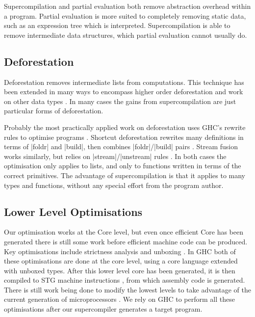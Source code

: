 \documentclass[draft]{sigplanconf}
\begin{document}
Supercompilation and partial evaluation both remove abstraction overhead within a program. Partial evaluation is more suited to completely removing static data, such as an expression tree which is interpreted. Supercompilation is able to remove intermediate data structures, which partial evaluation cannot usually do.

\subsection{Deforestation}

Deforestation \cite{wadler:deforestation} removes intermediate lists from computations. This technique has been extended in many ways to encompass higher order deforestation \cite{marlow:higher_order_deforestation} and work on other data types \cite{coutts:string_fusion}. In many cases the gains from supercompilation are just particular forms of deforestation.

Probably the most practically applied work on deforestation uses GHC's rewrite rules to optimise programs \cite{spj:rules}. Shortcut deforestation rewrites many definitions in terms of |foldr| and |build|, then combines |foldr|/|build| pairs \cite{gill:shortcut_deforestation}. Stream fusion works similarly, but relies on |stream|/|unstream| rules \cite{coutts:stream_fusion}. In both cases the optimisation only applies to lists, and only to functions written in terms of the correct primitives. The advantage of supercompilation is that it applies to many types and functions, without any special effort from the program author.

\subsection{Lower Level Optimisations}

Our optimisation works at the Core level, but even once efficient Core has been generated there is still some work before efficient machine code can be produced. Key optimisations include strictness analysis and unboxing \cite{spj:unboxing}. In GHC both of these optimisations are done at the core level, using a core language extended with unboxed types. After this lower level core has been generated, it is then compiled to STG machine instructions \cite{spj:stg}, from which assembly code is generated. There is still work being done to modify the lowest levels to take advantage of the current generation of microprocessors \cite{marlow:pointer_tagging}. We rely on GHC to perform all these optimisations after our supercompiler generates a target program.
\end{document}
